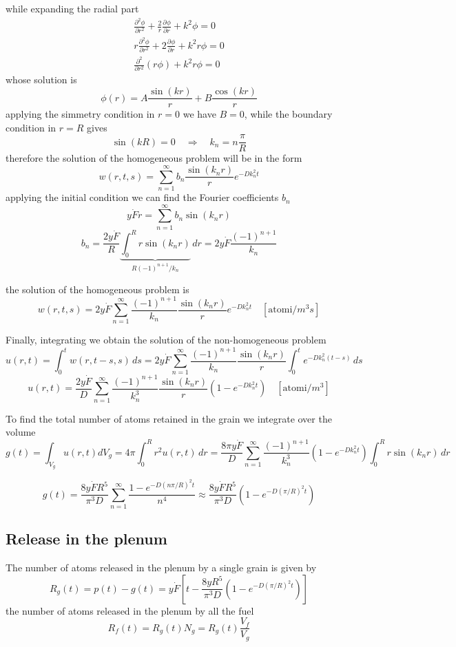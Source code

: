 \documentclass{article}
\newcommand{\pderiv}[3][]{\frac{\partial^{#1} #2}{\partial #3^{#1}}}
\begin{document}
while expanding the radial part
\begin{align*}
  \pderiv[2]{\phi}{r} + \frac{2}{r}\pderiv{\phi}{r} + k^2\phi = 0\\
  r\pderiv[2]{\phi}{r} + 2\pderiv{\phi}{r} + k^2r\phi = 0\\
  \pderiv[2]{}{r}(r\phi) + k^2r\phi = 0
\end{align*}
whose solution is
\[
  \phi(r) = A\frac{\sin(kr)}{r} + B\frac{\cos(kr)}{r}
\]
applying the simmetry condition in $r = 0$ we have $B = 0$, while the boundary condition in $r = R$ gives
\[
  \sin(kR) = 0 \quad\Rightarrow\quad k_n = n\frac{\pi}{R}
\]
therefore the solution of the homogeneous problem will be in the form
\[
  w(r,t,s) = \sum_{n=1}^{\infty} b_n \frac{\sin(k_nr)}{r}e^{-Dk_n^2t}
\]
applying the initial condition we can find the Fourier coefficients $b_n$
\[
  y\dot{F}r = \sum_{n=1}^{\infty} b_n \sin(k_nr)
\]
\[
  b_n = \frac{2y\dot{F}}{R}\underbrace{\int_0^R r\sin(k_nr)}_{R(-1)^{n+1} / k_n} \, dr = 2y\dot{F}\frac{(-1)^{n+1}}{k_n}
\]

the solution of the homogeneous problem is
\[
  w(r,t,s) = 2y\dot{F}\sum_{n=1}^{\infty} \frac{(-1)^{n+1}}{k_n}\frac{\sin(k_nr)}{r}e^{-Dk_n^2t} \quad [\text{atomi}/m^3s]
\]

Finally, integrating we obtain the solution of the non-homogeneous problem
\[
  u(r,t) = \int_0^t w(r,t-s,s) \, ds = 2y\dot{F}\sum_{n=1}^{\infty} \frac{(-1)^{n+1}}{k_n}\frac{\sin(k_nr)}{r}\int_0^t e^{-Dk_n^2(t-s)} \, ds
\]
\[
  u(r,t) = \frac{2y\dot{F}}{D}\sum_{n=1}^{\infty} \frac{(-1)^{n+1}}{k_n^3}\frac{\sin(k_nr)}{r}\left(1 - e^{-Dk_n^2t}\right)\quad [\text{atomi}/m^3]
\]

To find the total number of atoms retained in the grain we integrate over the volume
\[
  g(t) = \int_{V_g} u(r,t) dV_g = 4\pi\int_0^R r^2 u(r,t) \, dr = \frac{8\pi y\dot{F}}{D}\sum_{n=1}^{\infty} \frac{(-1)^{n+1}}{k_n^3}\left(1 - e^{-Dk_n^2t}\right)\int_0^R r\sin(k_nr) \, dr
\]

\[
  g(t) = \frac{8y\dot{F}R^5}{\pi^3D}\sum_{n=1}^\infty \frac{1 - e^{-D\left( n\pi/R \right)^2t}} {n^4} \approx \frac{8y\dot{F}R^5}{\pi^3D}\left(1 - e^{-D\left( \pi/R \right)^2t} \right)
\]

\subsection{Release in the plenum}
The number of atoms released in the plenum by a single grain is given by
\[
  R_g(t) = p(t) - g(t) = y\dot{F}\left[ t - \frac{8yR^5}{\pi^3D}(1 - e^{-D\left( \pi/R \right)^2t})\right]
\]
the number of atoms released in the plenum by all the fuel
\[
  R_f(t) = R_g(t)N_g = R_g(t)\frac{V_f}{V_g}
\]
\end{document}
